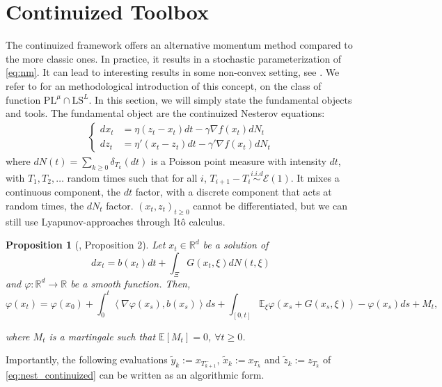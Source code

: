 \documentclass{article}
\def\R{{\mathbb{R}}}
\def\xz{(x_t,z_t)_{t\ge 0}}
\def\pl{{\text{PL}^\mu}}
\newcommand{\E}[1]{\mathbb{E}\left[#1 \right]}
\newcommand{\dotprod}[1]{\left< #1\right>}
\newcommand{\ls}{\text{LS}^{L}}
\theoremstyle{plain}
\newtheorem{proposition}[theorem]{Proposition}
\theoremstyle{definition}
\theoremstyle{remark}
\begin{document}
\section{Continuized Toolbox}\label{app:continuized_intro}
The continuized framework \cite{even2021continuized} offers an alternative momentum method compared to the more classic ones. In practice, it results in a stochastic parameterization of \eqref{eq:nm}. It can lead to interesting results in some non-convex setting, see \cite{wang2023continuized,hermant2025continuized}. We refer to \cite[Section 3]{hermant2025continuized} for an methodological introduction of this concept, on the class of function $\pl \cap \ls$. In this section, we will simply state the fundamental objects and tools. The fundamental object are the continuized Nesterov equations:
\begin{align}\label{eq:nest_continuized}\tag{CNE}\left\{
    \begin{array}{ll}
        dx_t &= \eta(z_t-x_t)dt - \gamma \nabla f(x_t) dN_t \\
        dz_t &= \eta'(x_t-z_t)dt - \gamma' \nabla f(x_t) dN_t
    \end{array}
\right.
\end{align} where $dN(t) = \sum_{k\ge 0} \delta_{T_k}(dt)$ is a Poisson point measure with intensity $dt$, with $T_1,T_2,\dots$ random times such that for all $i$, $T_{i+1}-T_i \overset{i.i.d}{\sim} \mathcal{E}(1)$. It mixes a continuous component, the $dt$ factor, with a discrete component that acts at random times, the $dN_t$ factor. $\xz$ cannot be differentiated, but we can still use Lyapunov-approaches through Itô calculus. 
\begin{proposition}[\cite{even2021continuized}, Proposition 2]\label{prop:sto_calc}
Let $x_t \in \R^d$ be a solution of 
\begin{equation*}
    dx_t = b(x_t)dt + \int_\Xi G(x_t,\xi)dN(t,\xi)
\end{equation*}
and $\varphi : \R^d \to \R$ be a smooth function. Then,
\begin{equation}
    \varphi(x_t) = \varphi(x_0) + \int_{0}^t \dotprod{\nabla \varphi(x_s),b(x_s)}ds + \int_{[0,t]}  \mathbb{E}_\xi{ \varphi(x_s + G(x_s,\xi)) - \varphi(x_s)}ds + M_t,
\end{equation}

where $M_t$ is a martingale such that $\E{M_t}=0$, $\forall t\ge 0$.

\end{proposition}
Importantly, the following evaluations $\tilde{y}_k := x_{T_{k+1}^-}$, $\tilde{x}_k := x_{T_{k}}$ and $\tilde{z}_k := z_{T_{k}}$ of \eqref{eq:nest_continuized} can be written as an algorithmic form. 
\end{document}
